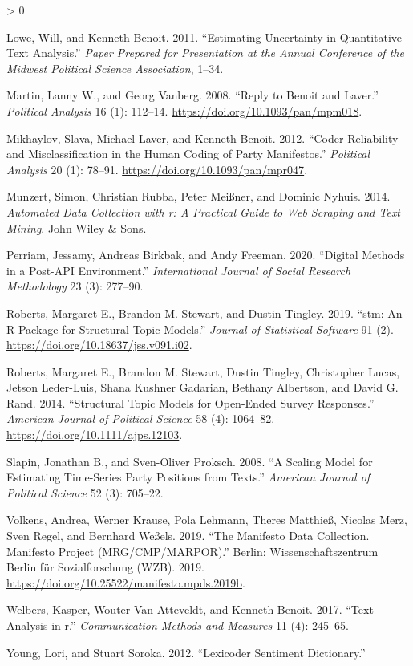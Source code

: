\documentclass[
]{book}
\newlength{\cslhangindent}
\newenvironment{CSLReferences}[2] %
 {%
  \setlength{\parindent}{0pt}
  \ifodd #1 \everypar{\setlength{\hangindent}{\cslhangindent}}\ignorespaces\fi
  \ifnum #2 > 0
  \setlength{\parskip}{#2\baselineskip}
  \fi
 }%
 {}
\begin{document}
\begin{CSLReferences}{1}{0}
\leavevmode\hypertarget{ref-Lowe2011a}{}%
Lowe, Will, and Kenneth Benoit. 2011. {``Estimating Uncertainty in Quantitative Text Analysis.''} \emph{Paper Prepared for Presentation at the Annual Conference of the Midwest Political Science Association}, 1--34.

\leavevmode\hypertarget{ref-Martin2008a}{}%
Martin, Lanny W., and Georg Vanberg. 2008. {``Reply to Benoit and Laver.''} \emph{Political Analysis} 16 (1): 112--14. \url{https://doi.org/10.1093/pan/mpm018}.

\leavevmode\hypertarget{ref-Mikhaylov2012a}{}%
Mikhaylov, Slava, Michael Laver, and Kenneth Benoit. 2012. {``Coder Reliability and Misclassification in the Human Coding of Party Manifestos.''} \emph{Political Analysis} 20 (1): 78--91. \url{https://doi.org/10.1093/pan/mpr047}.

\leavevmode\hypertarget{ref-Munzert2014}{}%
Munzert, Simon, Christian Rubba, Peter Meißner, and Dominic Nyhuis. 2014. \emph{Automated Data Collection with r: A Practical Guide to Web Scraping and Text Mining}. John Wiley \& Sons.

\leavevmode\hypertarget{ref-Perriam2020}{}%
Perriam, Jessamy, Andreas Birkbak, and Andy Freeman. 2020. {``Digital Methods in a Post-API Environment.''} \emph{International Journal of Social Research Methodology} 23 (3): 277--90.

\leavevmode\hypertarget{ref-Roberts2019a}{}%
Roberts, Margaret E., Brandon M. Stewart, and Dustin Tingley. 2019. {``{stm: An R Package for Structural Topic Models}.''} \emph{Journal of Statistical Software} 91 (2). \url{https://doi.org/10.18637/jss.v091.i02}.

\leavevmode\hypertarget{ref-Roberts2014a}{}%
Roberts, Margaret E., Brandon M. Stewart, Dustin Tingley, Christopher Lucas, Jetson Leder-Luis, Shana Kushner Gadarian, Bethany Albertson, and David G. Rand. 2014. {``Structural Topic Models for Open-Ended Survey Responses.''} \emph{American Journal of Political Science} 58 (4): 1064--82. \url{https://doi.org/10.1111/ajps.12103}.

\leavevmode\hypertarget{ref-Slapin2008a}{}%
Slapin, Jonathan B., and Sven-Oliver Proksch. 2008. {``A Scaling Model for Estimating Time-Series Party Positions from Texts.''} \emph{American Journal of Political Science} 52 (3): 705--22.

\leavevmode\hypertarget{ref-Volkens2019a}{}%
Volkens, Andrea, Werner Krause, Pola Lehmann, Theres Matthieß, Nicolas Merz, Sven Regel, and Bernhard Weßels. 2019. {``{The Manifesto Data Collection. Manifesto Project (MRG/CMP/MARPOR)}.''} Berlin: Wissenschaftszentrum Berlin f{ü}r Sozialforschung (WZB). 2019. \url{https://doi.org/10.25522/manifesto.mpds.2019b}.

\leavevmode\hypertarget{ref-Welbers2017}{}%
Welbers, Kasper, Wouter Van Atteveldt, and Kenneth Benoit. 2017. {``Text Analysis in r.''} \emph{Communication Methods and Measures} 11 (4): 245--65.

\leavevmode\hypertarget{ref-Young2012}{}%
Young, Lori, and Stuart Soroka. 2012. {``Lexicoder Sentiment Dictionary.''}

\end{CSLReferences}
\end{document}
